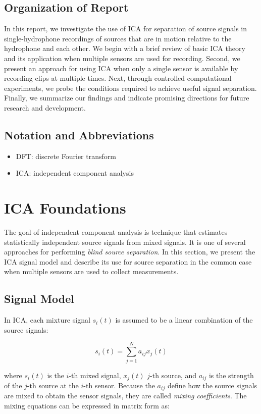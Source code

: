 \documentclass[10pt]{article}
\begin{document}
\subsection*{Organization of Report}
In this report, we investigate the use of ICA for separation of source signals in
single-hydrophone recordings of sources that are in motion relative to the hydrophone and
each other. We begin with a brief review of basic ICA theory and its application when
multiple sensors are used for recording. Second, we present an approach for using ICA when
only a single sensor is available by recording clips at multiple times. Next, through
controlled computational experiments, we probe the conditions required to achieve useful
signal separation. Finally, we summarize our findings and indicate promising directions
for future research and development.

\subsection*{Notation and Abbreviations}
\begin{itemize}
    \item DFT: discrete Fourier transform
    \item ICA: independent component analysis
\end{itemize}


\section{ICA Foundations}
The goal of independent component analysis is technique that estimates statistically
independent source signals from mixed signals. It is one of several approaches for
performing \emph{blind source separation}. In this section, we present the ICA signal
model and describe its use for source separation in the common case when multiple sensors
are used to collect measurements.

\subsection*{Signal Model}
In ICA, each mixture signal $s_i(t)$ is assumed to be a linear combination of the source
signals:

$$
s_i(t) = \sum_{j=1}^N a_{ij} x_j(t)
$$

\noindent where $s_i(t)$ is the $i$-th mixed signal, $x_j(t)$ $j$-th source, and $a_{ij}$
is the strength of the $j$-th source at the $i$-th sensor. Because the $a_{ij}$ define how
the source signals are mixed to obtain the sensor signals, they are called \emph{mixing
coefficients}. The mixing equations can be expressed in matrix form as:
\end{document}
